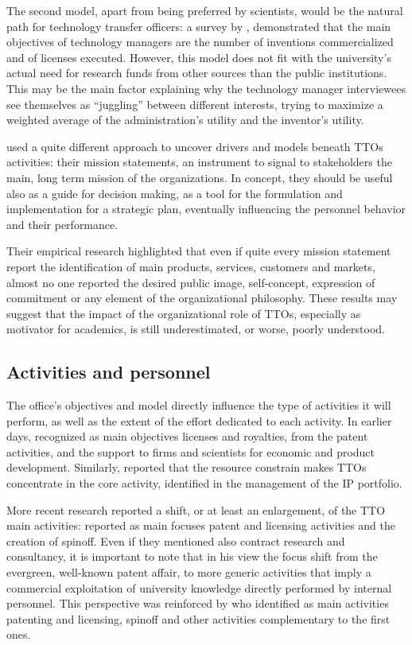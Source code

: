 The second model, apart from being preferred by scientists, would be the natural path for technology transfer officers: a survey by \citet{Jensen1998}, demonstrated that the main objectives of technology managers are the number of inventions commercialized and of licenses executed. However, this model does not fit with the university's actual need for research funds from other sources than the public institutions. This may be the main factor explaining why the technology manager interviewees see themselves as \enquote{juggling} between different interests, trying to maximize a weighted average of the administration's utility and the inventor's utility.

\citet{Fitzgerald2015} used a quite different approach to uncover drivers and models beneath TTOs activities: their mission statements, an instrument to signal to stakeholders the main, long term mission of the organizations. In concept, they should be useful also as a guide for decision making, as a tool for the formulation and implementation for a strategic plan, eventually influencing the personnel behavior and their performance.

Their empirical research highlighted that even if quite every mission statement report the identification of main products, services, customers and markets, almost no one reported the desired public image, self-concept, expression of commitment or any element of the organizational philosophy. These results may suggest that the impact of the organizational role of TTOs, especially as motivator for academics, is still underestimated, or worse, poorly understood. 

\subsection{Activities and personnel}

The office's objectives and model directly influence the type of activities it will perform, as well as the extent of the effort dedicated to each activity. In earlier days, \citet{Siegel2003a} recognized as main objectives licenses and royalties, from the patent activities, and the support to firms and scientists for economic and product development. Similarly, \citet{OwenSmith2001} reported that the resource constrain makes TTOs concentrate in the core activity, identified in the management of the IP portfolio.

More recent research reported a shift, or at least an enlargement, of the TTO main activities: \citet{Geuna2009} reported as main focuses patent and licensing activities and the creation of spinoff. Even if they mentioned also contract research and consultancy, it is important to note that in his view the focus shift from the evergreen, well-known patent affair, to more generic activities that imply a commercial exploitation of university knowledge directly performed by internal personnel. This perspective was reinforced by \citet{Balderi2010} who identified as main activities patenting and licensing, spinoff and other activities complementary to the first ones.

